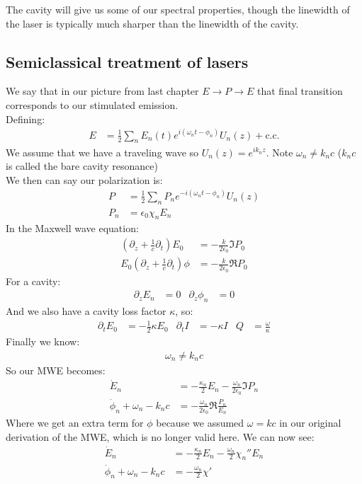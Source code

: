 The cavity will give us some of our spectral properties, though the linewidth of the laser is typically much sharper than the linewidth of the cavity.
\subsection{Semiclassical treatment of lasers}
We say that in our picture from last chapter $E\to P\to E$ that final transition corresponds to our stimulated emission.\\
Defining:
\begin{align*}
	E &= \frac{1}{2}\sum_n E_n(t) e^{i(\omega_n t - \phi_n)} U_n(z) + \text{c.c.}
\end{align*}
We assume that we have a traveling wave so $U_n(z) = e^{ik_n z}$. Note $\omega_n \neq k_n c$ ($k_n c$ is called the bare cavity resonance) \\
We then can say our polarization is:
\begin{align*}
	P &= \frac{1}{2}\sum_n P_n e^{-i(\omega_n t - \phi_n)} U_n(z) \\
	P_n &= \epsilon_0 \chi_n E_n
\end{align*}
In the Maxwell wave equation:
\begin{align*}
	\left(\partial_z + \frac{1}{c}\partial_t\right)E_0 &= -\frac{k}{2\epsilon_0} \Im P_0 \\
	E_0\left(\partial_z + \frac{1}{c}\partial_t\right)\phi &= -\frac{k}{2\epsilon_0}\Re P_0
\end{align*}
For a cavity:
\begin{align*}
	\partial_z E_n &= 0 &
	\partial_z \phi_n &= 0
\end{align*}
And we also have a cavity loss factor $\kappa$, so:
\begin{align*}
	\partial_t E_0 &= -\frac{1}{2}\kappa E_0 &
	\partial_t I &= -\kappa I &
	Q &= \frac{\omega}{\kappa}
\end{align*}
Finally we know:
\begin{align*}
	\omega_n\neq k_n c
\end{align*}
So our MWE becomes:
\begin{align*}
	\dot{E}_n &= -\frac{\kappa_n}{2}E_n - \frac{\omega_n}{2\epsilon_0}\Im P_n \\
	\dot{\phi}_n +\omega_n - k_n c &= -\frac{\omega_n}{2\epsilon_0}\Re \frac{P_n}{E_n}
\end{align*}
Where we get an extra term for $\phi$ because we assumed $\omega = kc$ in our original derivation of the MWE, which is no longer valid here. We can now see:
\begin{align*}
	\dot{E}_n &= -\frac{\kappa_n}{2}E_n - \frac{\omega_n}{2}\chi_n'' E_n \\
	\dot{\phi}_n + \omega_n - k_n c &= -\frac{\omega_n}{2}\chi'
\end{align*}
